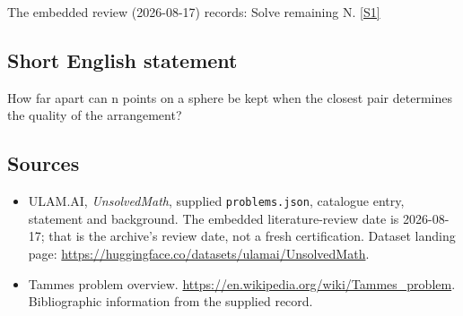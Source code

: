 \documentclass[11pt,a4paper]{article}
\newcommand{\sref}[2]{\hyperlink{source:#1:#2}{[S#2]}}
\begin{document}
The embedded review (2026-08-17) records: Solve remaining N. \sref{statement}{1}

\subsection{Short English statement}

How far apart can n points on a sphere be kept when the closest pair determines the quality of the arrangement?

\subsection{Sources}

{\small

\begin{itemize}

\item[\hypertarget{source:statement:1}{S1}] ULAM.AI, \emph{UnsolvedMath}, supplied \texttt{problems.json}, catalogue entry, statement and background. The embedded literature-review date is 2026-08-17; that is the archive’s review date, not a fresh certification. Dataset landing page: \url{https://huggingface.co/datasets/ulamai/UnsolvedMath}.

\item[\hypertarget{source:statement:2}{S2}] Tammes problem overview. \url{https://en.wikipedia.org/wiki/Tammes_problem}. Bibliographic information from the supplied record.

\end{itemize}

}

\label{end:statement}
\end{document}
